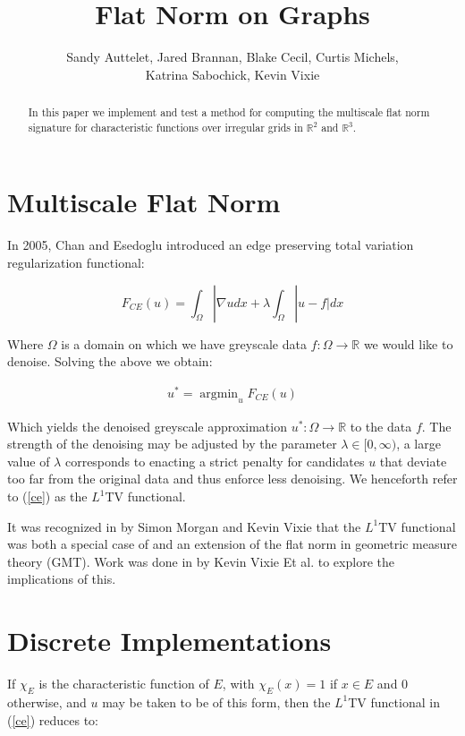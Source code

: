 \documentclass[12pt]{article}
\title{Flat Norm on Graphs}
\author{Sandy Auttelet, Jared Brannan, Blake Cecil, Curtis Michels,\\
 Katrina Sabochick, Kevin Vixie }
\DeclareMathOperator*{\argmin}{argmin}
\begin{document}
\maketitle

\begin{abstract}
In this paper we implement and test a method for computing the multiscale flat norm signature for characteristic functions over irregular grids in $\mathbb{R}^2$ and $\mathbb{R}^3$.
\end{abstract}

\tableofcontents

\section{Multiscale Flat Norm}

In 2005, Chan and Esedoglu introduced an edge preserving total variation regularization functional:

\begin{equation} \label{ce}
F_{CE}(u) = \int_\Omega |\nabla u dx + \lambda \int_{\Omega} |u-f|dx
\end{equation}

Where $\Omega$ is a domain on which we have greyscale data $f:\Omega \to \mathbb{R}$ we would like to denoise. Solving the above we obtain:

\begin{align*}
u^* = \argmin_u F_{CE}(u)
\end{align*}

Which yields the denoised greyscale approximation $u^*:\Omega \to \mathbb{R}$ to the data $f$. The strength of the denoising may be adjusted by the parameter $\lambda \in [0,\infty)$, a large value of $\lambda$ corresponds to enacting a strict penalty for candidates $u$ that deviate too far from the original data and thus enforce less denoising. We henceforth refer to (\ref{ce}) as the $L^1$TV functional.

It was recognized in \cite{Morgan_2007} by Simon Morgan and Kevin Vixie that the $L^1$TV functional was both a special case of and an extension of the flat norm in geometric measure theory (GMT). Work was done in \cite{shapes} by Kevin Vixie Et al. to explore the implications of this.


\section{Discrete Implementations}

If $\chi_E$ is the characteristic function of $E$, with $\chi_E(x) = 1$ if $x \in E$ and $0$ otherwise, and $u$ may be taken to be of this form, then the $L^1$TV functional in (\ref{ce}) reduces to:
\end{document}
